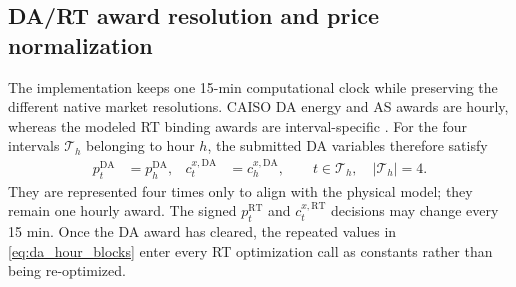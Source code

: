 \documentclass[final,5p,times]{elsarticle}
\newcommand{\DA}{\mathrm{DA}}
\newcommand{\RT}{\mathrm{RT}}
\newcommand{\calT}{\mathcal{T}}
\begin{document}
\subsection{DA/RT award resolution and price normalization}
\label{sec:price_resolution}
The implementation keeps one 15-min computational clock while preserving the
different native market resolutions. CAISO DA energy and AS awards are hourly,
whereas the modeled RT binding awards are interval-specific
\cite{caisoMarketInstruments2026}. For the four intervals
$\calT_h$ belonging to hour $h$, the submitted DA variables therefore satisfy
\begin{align}
p_t^{\DA}&=p_h^{\DA},&
c_t^{x,\DA}&=c_h^{x,\DA},
\qquad t\in\calT_h,\quad |\calT_h|=4. \label{eq:da_hour_blocks}
\end{align}
They are represented four times only to align with the physical model; they
remain one hourly award. The signed $p_t^{\RT}$ and $c_t^{x,\RT}$ decisions
may change every 15 min. Once the DA award has cleared, the repeated values in
\eqref{eq:da_hour_blocks} enter every RT optimization call as constants rather than being
re-optimized.
\end{document}
